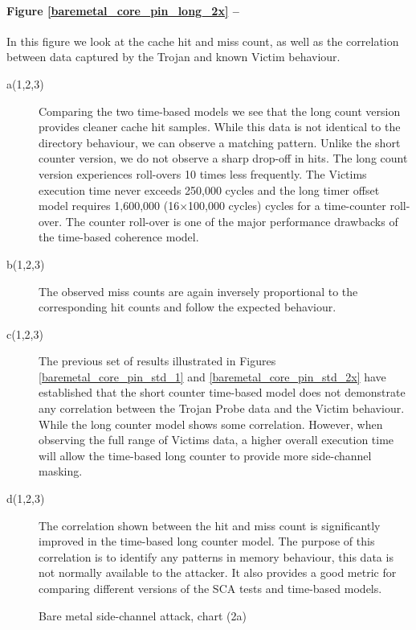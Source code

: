 				\paragraph{Figure \ref{baremetal_core_pin_long_2x} --}
					In this figure we look at the cache hit and miss count, as well as the correlation between data captured by the Trojan and known Victim behaviour.
					\begin{description}
					\item [a(1,2,3)] 
						Comparing the two time-based models we see that the long count version provides cleaner cache hit samples. While this data is not identical to the directory behaviour, we can observe a matching pattern. Unlike the short counter version, we do not observe a sharp drop-off in hits. The long count version experiences roll-overs 10 times less frequently.
						The Victims execution time never exceeds 250,000 cycles and the long timer offset model requires 1,600,000 (16$\times$100,000 cycles) cycles for a time-counter roll-over. 
						The counter roll-over is one of the major performance drawbacks of the time-based coherence model.
					\item [b(1,2,3)] 
						The observed miss counts are again inversely proportional to the corresponding hit counts and follow the expected behaviour. 
					\item [c(1,2,3)] 
						The previous set of results illustrated in Figures \ref{baremetal_core_pin_std_1} and \ref{baremetal_core_pin_std_2x}
						have established that the short counter time-based model does not demonstrate any correlation between the Trojan Probe data and the Victim behaviour. While the long counter model shows some correlation. However, when observing the full range of Victims data, a higher overall execution time will allow the time-based long counter to provide more side-channel masking.
					\item [d(1,2,3)]
						The correlation shown between the hit and miss count is significantly improved in the time-based long counter model. The purpose of this correlation is to identify any patterns in memory behaviour, this data is not normally available to the attacker. It also provides a good metric for comparing different versions of the SCA tests and time-based models.
					\end{description}
					\begin{figure}[!h]
					\centering 
						\caption{Bare metal side-channel attack, chart (2a)} 
						\label{baremetal_core_pin_long_1}
					\end{figure}
					

